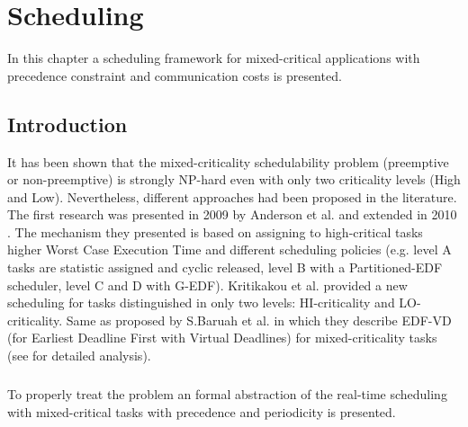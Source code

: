 
\chapter{Scheduling}

\ifpdf
    \graphicspath{{Chapters/Figs/Raster/}{Chapters/Figs/PDF/}{Chapters/Figs/}}
\else
    \graphicspath{{Chapters/Figs/Vector/}{Chapters/Figs/}}
\fi

In this chapter a scheduling framework for mixed-critical applications with precedence constraint and communication costs is presented.

\section{Introduction}
\par It has been shown \cite{MCSNPhard} that the mixed-criticality schedulability problem (preemptive or non-preemptive) is strongly NP-hard even with only two criticality levels (High and Low). Nevertheless, different approaches had been proposed in the literature. The first research was presented in 2009 by Anderson et al.\cite{Anderson09} and extended in 2010 \cite{Mollison10}. The mechanism they presented is based on assigning to high-critical tasks higher Worst Case Execution Time and different scheduling policies (e.g. level A tasks are statistic assigned and cyclic released, level B with a Partitioned-EDF scheduler, level C and D with G-EDF). Kritikakou et al.\cite{Kritikakou14} provided a new scheduling for tasks distinguished in only two levels: HI-criticality and LO-criticality. Same as proposed by S.Baruah et al.\cite{Baruah2012EDFVD} in which they describe EDF-VD (for Earliest Deadline First with Virtual Deadlines)  for mixed-criticality tasks (see \cite{Zhang2014} for detailed analysis).

\paragraph{}To properly treat the problem an formal abstraction of the real-time scheduling with mixed-critical tasks with precedence and periodicity is presented.

